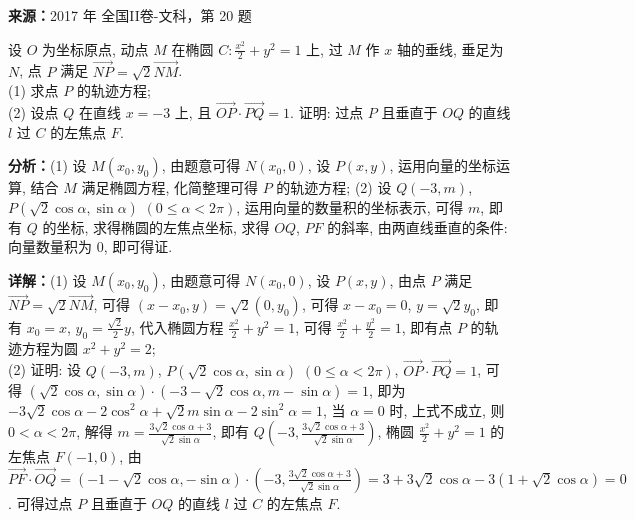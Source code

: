 \begin{question}[points=12]
\textbf{来源：}2017 年 全国II卷-文科，第 20 题\par
设 $O$ 为坐标原点, 动点 $M$ 在椭圆 $C: \frac{x^2}{2}+y^2=1$ 上, 过 $M$ 作 $x$ 轴的垂线, 垂足为 $N$, 点 $P$ 满足 $\overrightarrow{NP}=\sqrt{2}\overrightarrow{NM}$. \\ (1) 求点 $P$ 的轨迹方程; \\ (2) 设点 $Q$ 在直线 $x=-3$ 上, 且 $\overrightarrow{OP}\cdot\overrightarrow{PQ}=1$. 证明: 过点 $P$ 且垂直于 $OQ$ 的直线 $l$ 过 $C$ 的左焦点 $F$.
\begin{solution}

\textbf{分析：}(1) 设 $M(x_0,y_0)$, 由题意可得 $N(x_0,0)$, 设 $P(x,y)$, 运用向量的坐标运算, 结合 $M$ 满足椭圆方程, 化简整理可得 $P$ 的轨迹方程; (2) 设 $Q(-3,m)$, $P(\sqrt{2}\cos\alpha,\sin\alpha)$ $(0\le\alpha<2\pi)$, 运用向量的数量积的坐标表示, 可得 $m$, 即有 $Q$ 的坐标, 求得椭圆的左焦点坐标, 求得 $OQ$, $PF$ 的斜率, 由两直线垂直的条件: 向量数量积为 $0$, 即可得证.

\textbf{详解：}(1) 设 $M(x_0,y_0)$, 由题意可得 $N(x_0,0)$, 设 $P(x,y)$, 由点 $P$ 满足 $\overrightarrow{NP}=\sqrt{2}\overrightarrow{NM}$, 可得 $(x-x_0,y)=\sqrt{2}(0,y_0)$, 可得 $x-x_0=0$, $y=\sqrt{2}y_0$, 即有 $x_0=x$, $y_0=\frac{\sqrt{2}}{2}y$, 代入椭圆方程 $\frac{x^2}{2}+y^2=1$, 可得 $\frac{x^2}{2}+\frac{y^2}{2}=1$, 即有点 $P$ 的轨迹方程为圆 $x^2+y^2=2$; \\ (2) 证明: 设 $Q(-3,m)$, $P(\sqrt{2}\cos\alpha,\sin\alpha)$ $(0\le\alpha<2\pi)$, $\overrightarrow{OP}\cdot\overrightarrow{PQ}=1$, 可得 $(\sqrt{2}\cos\alpha,\sin\alpha)\cdot(-3-\sqrt{2}\cos\alpha,m-\sin\alpha)=1$, 即为 $-3\sqrt{2}\cos\alpha-2\cos^2\alpha+\sqrt{2}m\sin\alpha-2\sin^2\alpha=1$, 当 $\alpha=0$ 时, 上式不成立, 则 $0<\alpha<2\pi$, 解得 $m=\frac{3\sqrt{2}\cos\alpha+3}{\sqrt{2}\sin\alpha}$, 即有 $Q\left(-3,\frac{3\sqrt{2}\cos\alpha+3}{\sqrt{2}\sin\alpha}\right)$, 椭圆 $\frac{x^2}{2}+y^2=1$ 的左焦点 $F(-1,0)$, 由 $\overrightarrow{PF}\cdot\overrightarrow{OQ}=(-1-\sqrt{2}\cos\alpha,-\sin\alpha)\cdot\left(-3,\frac{3\sqrt{2}\cos\alpha+3}{\sqrt{2}\sin\alpha}\right)=3+3\sqrt{2}\cos\alpha-3(1+\sqrt{2}\cos\alpha)=0$. 可得过点 $P$ 且垂直于 $OQ$ 的直线 $l$ 过 $C$ 的左焦点 $F$.
\end{solution}
\end{question}

